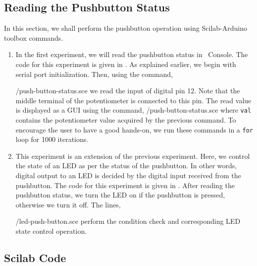 \subsection{Reading the Pushbutton Status}
In this section, we shall perform the pushbutton operation using
Scilab-Arduino toolbox commands.
\begin{enumerate}
\item In the first experiment, we will read the pushbutton status in
  \scilab\ Console. The code for this experiment is given in
  . As explained earlier, we begin with serial
  port initialization. Then, using the command,
  
  {\LocPushscicode/push-button-status.sce} we read the input of
  digital pin 12. Note that the middle terminal of the potentiometer
  is connected to this pin. The read value is displayed as a GUI using
  the command, 
  {\LocPushscicode/push-button-status.sce} where {\tt val} contains
  the potentiometer value acquired by the previous command. To
  encourage the user to have a good hands-on, we run these commands in
  a {\tt for} loop for 1000 iterations.

\item This experiment is an extension of the previous
  experiment. Here, we control the state of an LED as per the status
  of the pushbutton. In other words, digital output to an LED is
  decided by the digital input received from the pushbutton. The code
  for this experiment is given in . After reading
  the pushbutton status, we turn the LED on if the pushbutton is
  pressed, otherwise we turn it off. The lines,
  
  {\LocPushscicode/led-push-button.sce} perform the condition check
  and corresponding LED state control operation.
\end{enumerate}

\subsection{Scilab Code}
\label{sec:push-scilab-code}

\begin{scicode}
\label{sci:push-100}

\end{scicode}

